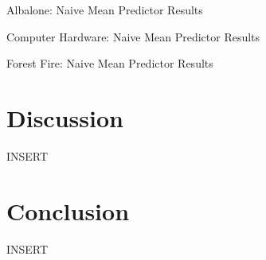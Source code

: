 \documentclass[twoside,11pt]{article}
\begin{document}
\begin{table}[h!]
	\begin{center}
		\caption{Albalone: Naive Mean Predictor Results}
		\label{tab:table4}
	\end{center}
\end{table}

\begin{table}[h!]
	\begin{center}
		\caption{Computer Hardware: Naive Mean Predictor Results}
		\label{tab:table5}
	\end{center}
\end{table}

\begin{table}[h!]
	\begin{center}
		\caption{Forest Fire: Naive Mean Predictor Results}
		\label{tab:table6}
	\end{center}
\end{table}



\newpage

\section{Discussion}
INSERT\\ 

\section{Conclusion}
INSERT\\ 

\newpage
\end{document}
